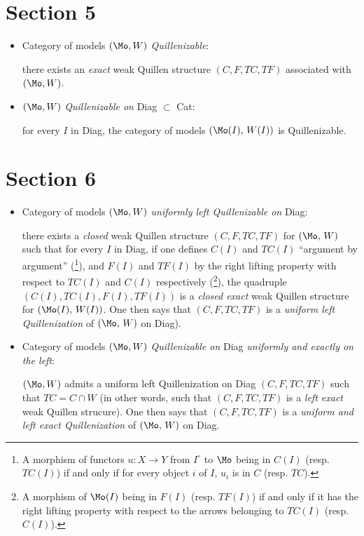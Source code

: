\section*{Section 5}

\begin{itemize}
\item[\textbullet] Category of models $(\Mo,W)$ \textit{Quillenizable}:

there exists an \textit{exact} weak Quillen structure $(C,F,TC,TF)$ associated with $(\Mo,W)$.

\item[\textbullet] $(\Mo,W)$ \textit{Quillenizable on} Diag $\subset$ Cat:

for every $I$ in Diag, the category of models $(\Mo(I),\, W(I))$ is Quillenizable.
\end{itemize}

\section*{Section 6}

\begin{itemize}
\item[\textbullet] Category of models $(\Mo,W)$ \textit{uniformly left Quillenizable on} Diag:

there exists a \textit{closed} weak Quillen structure $(C,F,TC,TF)$ for $(\Mo,\, W)$ such that for every $I$ in Diag, if one defines $C(I)$ and $TC(I)$ ``argument by argument'' (\footnote{A morphism of functors $u : X \longrightarrow Y$ from $I^{\circ}$ to $\Mo$ being in $C(I)$ (resp. $TC(I)$) if and only if for every object $i$ of $I$, $u_i$ is in $C$ (resp. $TC$).}), and $F(I)$ and $TF(I)$ by the right lifting property with respect to $TC(I)$ and $C(I)$ respectively (\footnote{A morphism of $\Mo(I)$ being in $F(I)$ (resp. $TF(I)$) if and only if it has the right lifting property with respect to the arrows belonging to $TC(I)$ (resp. $C(I)$).}), the quadruple $(C(I),TC(I),F(I),TF(I))$ is a \textit{closed exact} weak Quillen structure for $(\Mo(I),\, W(I))$. One then says that $(C,F,TC,TF)$ is a \textit{uniform left Quillenization} of $(\Mo,\, W)$ on Diag).
\end{itemize}


\begin{itemize}
\item[\textbullet] Category of models $(\Mo,W)$ \textit{Quillenizable on} Diag \textit{uniformly and exactly on the left}:

$(\Mo,W)$ admits a uniform left Quillenization on Diag $(C,F,TC,TF)$ such that $TC = C \cap W$ (in other words, such that $(C,F,TC,TF)$ is a \textit{left exact} weak Quillen strucure). One then says that $(C,F,TC,TF)$ is a \textit{uniform and left exact Quillenization} of $(\Mo,\, W)$ on Diag. %
\end{itemize}

